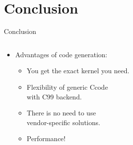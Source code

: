 \documentclass[@BEAMER_OPTIONS@]{beamer}
\newcommand{\CXX}{{\rm C}\plusplus}
\newcommand{\CC}{{\rm C99}\xspace}
\begin{document}
\note{}

\section{Conclusion}
\begin{frame}[label=conclusion]{Conclusion}
    \begin{columns}
        \begin{column}{0.55\textwidth}
            \begin{itemize}
                \item Advantages of code generation:
                    \vspace{0.5\baselineskip}
                    \begin{itemize}
                        \item You get the exact kernel you need.
                            \vspace{0.5\baselineskip}
                        \item Flexibility of generic \CXX code\\
                            with \CC backend.
                            \vspace{0.5\baselineskip}
                        \item There is no need to use\\
                            vendor-specific solutions.
                            \vspace{\baselineskip}
                        \item Performance!
                    \end{itemize}
            \end{itemize}
        \end{column}
        \begin{column}{0.45\textwidth}
            \vspace{-1\baselineskip}
            \begin{figure}
                \begin{center}

\end{center}
\end{figure}
\end{column}
\end{columns}
\end{frame}
\end{document}
